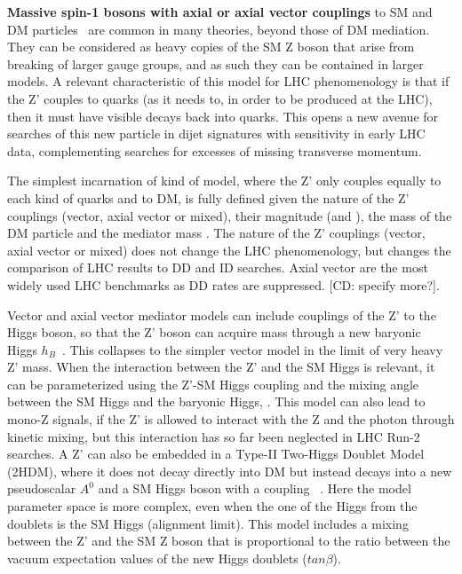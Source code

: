 
\textbf{Massive spin-1 bosons with axial or axial vector couplings} to SM and DM particles~\cite{Shoemaker:2011vi} are common in many theories, beyond those of DM mediation. They can be considered as heavy copies of the SM Z boson that arise from breaking of larger gauge groups, and as such they can be contained in larger models. A relevant characteristic of this model for LHC phenomenology is that if the Z' couples to quarks (as it needs to, in order to be produced at the LHC), then it must have visible decays back into quarks. This opens a new avenue for searches of this new particle in dijet signatures with sensitivity in early LHC data, complementing searches for excesses of missing transverse momentum. 

The simplest incarnation of kind of model, where the Z' only couples equally to each kind of quarks and to DM, is fully defined given the nature of the Z' couplings (vector, axial vector or mixed), their magnitude (\gq and \gDM), the mass of the DM particle \mdm and the mediator mass \mmed. The nature of the Z' couplings (vector, axial vector or mixed) does not change the LHC phenomenology, but changes the comparison of LHC results to DD and ID searches. Axial vector are the most widely used LHC benchmarks as DD rates are suppressed. [CD: specify more?]. 

Vector and axial vector mediator models can include couplings of the Z' to the Higgs boson, so that the Z' boson can acquire mass through a new baryonic Higgs $h_B$~\cite{Berlin:2014cfa}. This collapses to the simpler vector model in the limit of very heavy Z' mass. When the interaction between the Z' and the SM Higgs is relevant, it can be parameterized using the Z'-SM Higgs coupling \ghZprimeZprime and the mixing angle between the SM Higgs and the baryonic Higgs, \sinthetab. 
This model can also lead to mono-Z signals, if the Z' is allowed to interact with the Z and the photon through kinetic mixing, 
but this interaction has so far been neglected in LHC Run-2 searches. 
A Z' can also be embedded in a Type-II Two-Higgs Doublet Model (2HDM), where it does not decay directly into DM but instead decays into a new pseudoscalar $A^0$ and a SM Higgs boson with a coupling \gZprime~\cite{Berlin:2014cfa,Liew:2016oon}. Here the model parameter space is more complex, even when the one of the Higgs from the doublets is the SM Higgs (alignment limit). This model includes a mixing between the Z' and the SM Z boson that is proportional to the ratio between the vacuum expectation values of the new Higgs doublets ($tan \beta$). 

